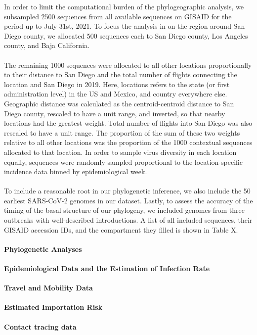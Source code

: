 \documentclass[12pt, a4paper]{article}
\begin{document}
    In order to limit the computational burden of the phylogeographic analysis, we subsampled 2500 sequences from all available sequences on GISAID for the period up to July 31st, 2021.
    To focus the analysis in on the region around San Diego county, we allocated 500 sequences each to San Diego county, Los Angeles county, and Baja California.
    \\~\\
    The remaining 1000 sequences were allocated to all other locations proportionally to their distance to San Diego and the total number of flights connecting the location and San Diego in 2019.
    Here, locations refers to the state (or first administration level) in the US and Mexico, and country everywhere else.
    Geographic distance was calculated as the centroid-centroid distance to San Diego county, rescaled to have a unit range, and inverted, so that nearby locations had the greatest weight.
    Total number of flights into San Diego was also rescaled to have a unit range.
    The proportion of the sum of these two weights relative to all other locations was the proportion of the 1000 contextual sequences allocated to that location.
    In order to sample virus diversity in each location equally, sequences were randomly sampled proportional to the location-specific incidence data binned by epidemiological week.
    \\~\\
    To include a reasonable root in our phylogenetic inference, we also include the 50 earliest SARS-CoV-2 genomes in our dataset.
    Lastly, to assess the accuracy of the timing of the basal structure of our phylogeny, we included genomes from three outbreaks with well-described introductions.
    A list of all included sequences, their GISAID accession IDs, and the compartment they filled is shown in Table X.

    \paragraph{Phylogenetic Analyses}
    \paragraph{Epidemiological Data and the Estimation of Infection Rate}
    \paragraph{Travel and Mobility Data}
    \paragraph{Estimated Importation Risk}
    \paragraph{Contact tracing data}
\end{document}
